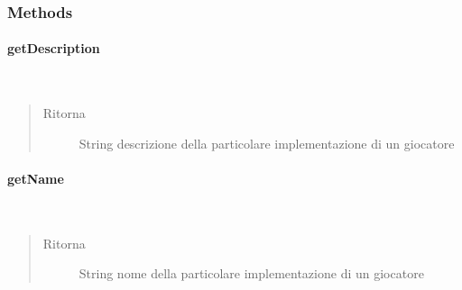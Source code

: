 \documentclass[letterpaper,10pt,italian,openany,oneside]{sphinxmanual}
\begin{document}
\subsubsection{Methods}
\label{\detokenize{test/it/unicam/cs/pa/mastermind/factories/PlayerFactory:methods}}

\paragraph{getDescription}
\label{\detokenize{test/it/unicam/cs/pa/mastermind/factories/PlayerFactory:getdescription}}

\begin{fulllineitems}
\label{\detokenize{test/it/unicam/cs/pa/mastermind/factories/PlayerFactory:it.unicam.cs.pa.mastermind.factories.PlayerFactory.getDescription()}}~\begin{quote}\begin{description}
\item[{Ritorna}] \leavevmode
String descrizione della particolare implementazione di un giocatore

\end{description}\end{quote}

\end{fulllineitems}



\paragraph{getName}
\label{\detokenize{test/it/unicam/cs/pa/mastermind/factories/PlayerFactory:getname}}

\begin{fulllineitems}
\label{\detokenize{test/it/unicam/cs/pa/mastermind/factories/PlayerFactory:it.unicam.cs.pa.mastermind.factories.PlayerFactory.getName()}}~\begin{quote}\begin{description}
\item[{Ritorna}] \leavevmode
String nome della particolare implementazione di un giocatore

\end{description}\end{quote}

\end{fulllineitems}
\end{document}
